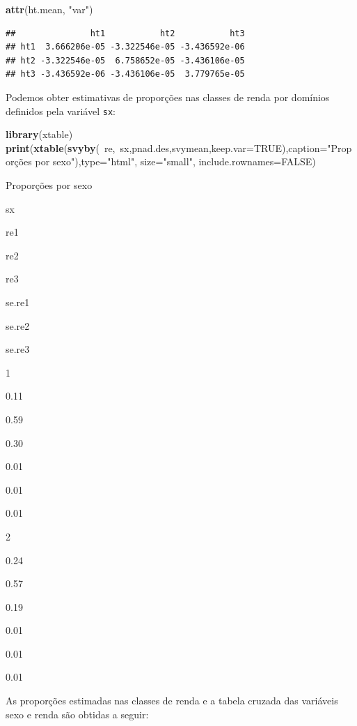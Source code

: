 \documentclass[]{book}
\newenvironment{Shaded}{\begin{snugshade}}{\end{snugshade}}
\newcommand{\KeywordTok}[1]{\textcolor[rgb]{0.13,0.29,0.53}{\textbf{{#1}}}}
\newcommand{\DataTypeTok}[1]{\textcolor[rgb]{0.13,0.29,0.53}{{#1}}}
\newcommand{\StringTok}[1]{\textcolor[rgb]{0.31,0.60,0.02}{{#1}}}
\newcommand{\OtherTok}[1]{\textcolor[rgb]{0.56,0.35,0.01}{{#1}}}
\newcommand{\NormalTok}[1]{{#1}}
\numberwithin{example}{chapter}
\numberwithin{remark}{chapter}
\numberwithin{definition}{chapter}
\begin{document}
\begin{Shaded}
\begin{Highlighting}[]
\KeywordTok{attr}\NormalTok{(ht.mean, }\StringTok{"var"}\NormalTok{)}
\end{Highlighting}
\end{Shaded}

\begin{verbatim}
##               ht1           ht2           ht3
## ht1  3.666206e-05 -3.322546e-05 -3.436592e-06
## ht2 -3.322546e-05  6.758652e-05 -3.436106e-05
## ht3 -3.436592e-06 -3.436106e-05  3.779765e-05
\end{verbatim}

Podemos obter estimativas de proporções nas classes de renda por
domínios definidos pela variável \texttt{sx}:

\begin{Shaded}
\begin{Highlighting}[]
\KeywordTok{library}\NormalTok{(xtable)}
\KeywordTok{print}\NormalTok{(}\KeywordTok{xtable}\NormalTok{(}\KeywordTok{svyby}\NormalTok{(~re,~sx,pnad.des,svymean,}\DataTypeTok{keep.var=}\OtherTok{TRUE}\NormalTok{),}\DataTypeTok{caption=}\StringTok{"Proporções por sexo"}\NormalTok{),}\DataTypeTok{type=}\StringTok{"html"}\NormalTok{, }\DataTypeTok{size=}\StringTok{"small"}\NormalTok{, }\DataTypeTok{include.rownames=}\OtherTok{FALSE}\NormalTok{)}
\end{Highlighting}
\end{Shaded}

Proporções por sexo

sx

re1

re2

re3

se.re1

se.re2

se.re3

1

0.11

0.59

0.30

0.01

0.01

0.01

2

0.24

0.57

0.19

0.01

0.01

0.01

As proporções estimadas nas classes de renda e a tabela cruzada das
variáveis sexo e renda são obtidas a seguir:
\end{document}
